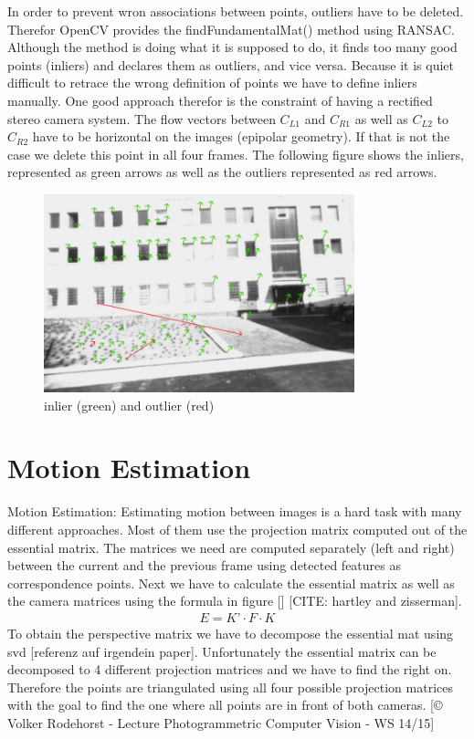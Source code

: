 \documentclass[11pt]{article}
\begin{document}
	In order to prevent wron associations between points, outliers have to be deleted. Therefor OpenCV provides the findFundamentalMat() method using RANSAC. Although the method is doing what it is supposed to do, it finds too many good points (inliers) and declares them as outliers, and vice versa. Because it is quiet difficult to retrace the wrong definition of points we have to define inliers manually. One good approach therefor is the constraint of having a rectified stereo camera system. The flow vectors between $C_{L1}$ and $C_{R1}$ as well as $C_{L2}$ to $C_{R2}$ have to be horizontal on the images (epipolar geometry). If that is not the case we delete this point in all four frames. The following figure shows the inliers, represented as green arrows as well as the outliers represented as red arrows.
	
	\begin{figure}[ht!]
		\centering
		\includegraphics[width=90mm]{images/inlier_outlier3.jpg}
		\caption{inlier (green) and outlier (red) \label{overflow}}
	\end{figure}
	

	\section{Motion Estimation}
	
	Motion Estimation:
	Estimating motion between images is a hard task with many different approaches. Most of them use the projection matrix computed out of the essential matrix. The matrices we need are computed separately (left and right) between the current and the previous frame using detected features as correspondence points. Next we have to calculate the essential matrix as well as the camera matrices using the formula in figure [] [CITE: hartley and zisserman].
	\begin{align}
	  E = K’ \cdot F \cdot K
	\end{align}
	To obtain the perspective matrix we have to decompose the essential mat using svd [referenz auf irgendein paper]. Unfortunately the essential matrix can be decomposed to 4 different projection matrices and we have to find the right on. Therefore the points are triangulated using all four possible projection matrices with the goal to find the one where all points are in front of both cameras.
	[© Volker Rodehorst - Lecture Photogrammetric Computer Vision - WS 14/15]
	
\end{document}
